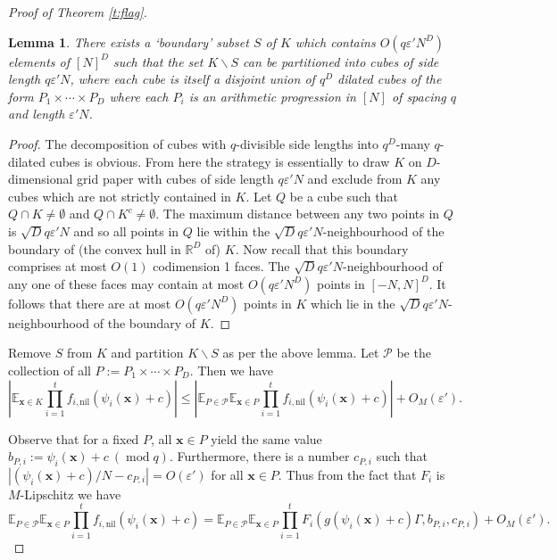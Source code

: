 \documentclass[10pt]{article}
\def\cP{\mathcal{P}}
\def\eps{\varepsilon}
\def\R{\mathbb{R}}
\def\E{\mathbb{E}}
\def\nil{\mathrm{nil}}
\DeclareMathOperator\mo{mod}
\newcommand{\vect}[1]{\boldsymbol{#1}}
\newtheorem{lemma}[firstthm]{Lemma}
\begin{document}
\begin{proof}[Proof of Theorem \ref{t:flag}]
\begin{lemma}\label{l:packing}
There exists a `boundary' subset $S$ of $K$ which contains $O(q\eps'N^D)$ elements of $[N]^D$ such that the set $K\backslash S$ can be partitioned into cubes of side length $q\eps'N$, where each cube is itself a disjoint union of $q^D$ dilated cubes of the form $P_1 \times \cdots \times P_D$ where each $P_i$ is an arithmetic progression in $[N]$ of spacing $q$ and length $\eps'N$.
\end{lemma} 
\begin{proof}
The decomposition of cubes with $q$-divisible side lengths into $q^D$-many $q$-dilated cubes is obvious. From here the strategy is essentially to draw $K$ on $D$-dimensional grid paper with cubes of side length $q \eps'N$ and exclude from $K$ any cubes which are not strictly contained in $K$. 
Let $Q$ be  a cube such that $Q \cap K \ne \emptyset$ and $Q \cap K^c \ne \emptyset$. 
The maximum distance between any two points in $Q$ is $\sqrt{D}q\eps'N$ and so all points in $Q$ lie within the $\sqrt{D}q\eps'N$-neighbourhood of the boundary of (the convex hull in $\R^D$ of) $K$. Now recall that this boundary comprises at most $O(1)$ codimension 1 faces. The $\sqrt{D}q\eps'N$-neighbourhood of any one of these faces may contain at most $O(q\eps'N^D)$ points in $[-N,N]^D$. It follows that there are at most $O(q\eps'N^D)$ points in $K$ which lie in the $\sqrt{D}q\eps'N$-neighbourhood of the boundary of $K$.
\end{proof}

Remove $S$ from $K$ and partition $K\backslash S$ as per the above lemma. Let $\cP$ be the collection of all $P:= P_1 \times \cdots \times P_D$. Then we have 
\begin{equation}
\left|\E_{\vect x \in K} \prod_{i=1}^t  f_{i,\nil}(\psi_i(\vect x) + c)\right| \leq \left|\E_{P\in \cP}\E_{\vect x \in P} \prod_{i=1}^t f_{i,\nil}(\psi_i(\vect x) + c)\right| + O_M(\eps').
\end{equation}

Observe that for a fixed $P$, all $\vect x \in P$ yield the same value $b_{P,i}:= \psi_i(\vect x) + c \ (\mo q)$. Furthermore, there is a number $c_{P,i}$ such that $|(\psi_i(\vect x) + c)/N-c_{P,i}| = O(\eps')$ for all $\vect x \in P$. Thus from the fact that $F_i$ is $M$-Lipschitz we have   
\begin{equation}
\E_{P\in \cP}\E_{\vect x \in P} \prod_{i=1}^t f_{i,\nil}( \psi_i(\vect x) + c) = \E_{P\in \cP}\E_{\vect x \in P} \prod_{i=1}^t F_i(g( \psi_i(\vect x) + c)\Gamma,b_{P,i},c_{P,i}) + O_M(\eps').
\end{equation}


\end{proof}
\end{document}

